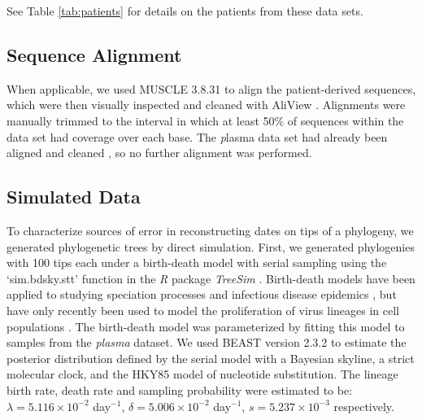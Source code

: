 \documentclass[12pt]{article}
\begin{document}
See Table \ref{tab:patients} for details on the patients from these data sets.

\subsection * {Sequence Alignment} \label{subsec:seqalign}
When applicable, we used MUSCLE 3.8.31 \citep{Muscle04} to align the patient-derived sequences, which were then visually inspected and cleaned with AliView \citep{AliView14}. 
Alignments were manually trimmed to the interval in which at least  50\% of sequences within the data set had coverage over each base.
The {\emph plasma} data set had already been aligned and cleaned \citep{McCloskey14}, so no further alignment was performed.

\subsection * {Simulated Data} \label{subsec:simdata}


To characterize sources of error in reconstructing dates on tips of a phylogeny, we generated phylogenetic trees by direct simulation. %
First, we generated phylogenies with 100 tips each under a birth-death model with serial sampling using the `sim.bdsky.stt' function in the \textit{R} package \textit{TreeSim} \citep{Boskova14}.
Birth-death models have been applied to studying speciation processes \citep{Nee:2006} and infectious disease epidemics \citep{Stradler13}, but have only recently been used to model the proliferation of virus lineages in cell populations \citep{Hartfield:2015}.
The birth-death model was parameterized by fitting this model to samples from the {\em plasma} dataset.
We used BEAST version 2.3.2 to estimate the posterior distribution defined by the serial model with a Bayesian skyline, a strict molecular clock, and the HKY85 \citep{HKY85} model of nucleotide substitution.
The lineage birth rate, death rate and sampling probability were estimated to be: $\lambda = 5.116 \times 10^{-2}$ day$^{-1}$, $\delta = 5.006 \times 10^{-2}$ day$^{-1}$, $s = 5.237 \times 10^{-3}$ respectively.
\end{document}
